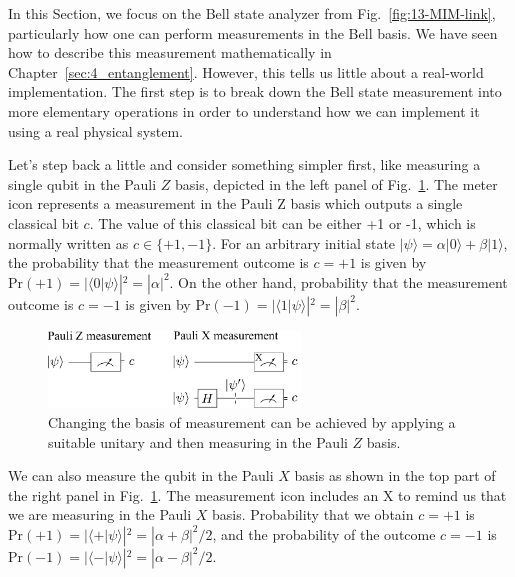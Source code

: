 In this Section, we focus on the Bell state analyzer from Fig.~\ref{fig:13-MIM-link}, particularly how one can perform measurements in the Bell basis.
We have seen how to describe this measurement mathematically in Chapter~\ref{sec:4_entanglement}.
However, this tells us little about a real-world implementation.
The first step is to break down the Bell state measurement into more elementary operations in order to understand how we can implement it using a real physical system.

Let's step back a little and consider something simpler first, like measuring a single qubit in the Pauli $Z$ basis, depicted in the left panel of Fig.~\ref{fig:13-2_measurementPauli}.
The meter icon represents a measurement in the Pauli Z basis which outputs a single classical bit $c$.
The value of this classical bit can be either +1 or -1, which is normally written as $c\in\{+1,-1\}$.
For an arbitrary initial state $|\psi\rangle = \alpha |0\rangle + \beta |1\rangle$, the probability that the measurement outcome is $c=+1$ is given by $\text{Pr}(+1)=|\langle0|\psi\rangle|^2=|\alpha|^2$.
On the other hand, probability that the measurement outcome is $c=-1$ is given by $\text{Pr}(-1)=|\langle1|\psi\rangle|^2=|\beta|^2$.

\begin{figure}[t]
    \centering
    \includegraphics[width=0.6\textwidth]{lesson13/13-2_measurementPauli.pdf}
    \caption[Changing the basis of measurements.]{Changing the basis of measurement can be achieved by applying a suitable unitary and then measuring in the Pauli $Z$ basis.}
    \label{fig:13-2_measurementPauli}
\end{figure}

We can also measure the qubit in the Pauli $X$ basis as shown in the top part of the right panel in Fig.~\ref{fig:13-2_measurementPauli}.
The measurement icon includes an X to remind us that we are measuring in the Pauli $X$ basis.
Probability that we obtain $c=+1$ is $\text{Pr}(+1)=|\langle+|\psi\rangle|^2=|\alpha+\beta|^2/2$, and the probability of the outcome $c=-1$ is $\text{Pr}(-1)=|\langle-|\psi\rangle|^2=|\alpha-\beta|^2/2$.

